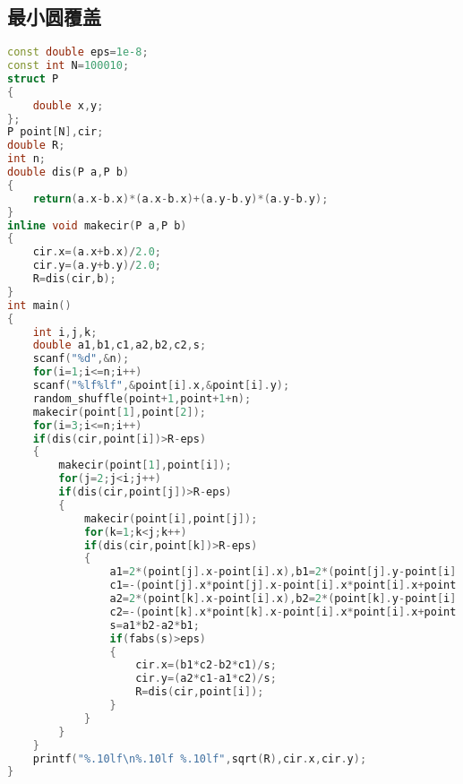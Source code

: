 \subsection{最小圆覆盖}
    \begin{lstlisting}[language=c++]
const double eps=1e-8;
const int N=100010;
struct P
{ 
    double x,y;
};
P point[N],cir;
double R;
int n;
double dis(P a,P b)
{
    return(a.x-b.x)*(a.x-b.x)+(a.y-b.y)*(a.y-b.y); 
}
inline void makecir(P a,P b)
{
    cir.x=(a.x+b.x)/2.0;
    cir.y=(a.y+b.y)/2.0;
    R=dis(cir,b);
}
int main()
{
    int i,j,k;
    double a1,b1,c1,a2,b2,c2,s;
    scanf("%d",&n);
    for(i=1;i<=n;i++)
    scanf("%lf%lf",&point[i].x,&point[i].y);
    random_shuffle(point+1,point+1+n);
    makecir(point[1],point[2]);
    for(i=3;i<=n;i++)
    if(dis(cir,point[i])>R-eps)
    {
        makecir(point[1],point[i]);
        for(j=2;j<i;j++)
        if(dis(cir,point[j])>R-eps)
        {
            makecir(point[i],point[j]);
            for(k=1;k<j;k++)
            if(dis(cir,point[k])>R-eps)
            {
                a1=2*(point[j].x-point[i].x),b1=2*(point[j].y-point[i].y),
                c1=-(point[j].x*point[j].x-point[i].x*point[i].x+point[j].y*point[j].y-point[i].y*point[i].y);
                a2=2*(point[k].x-point[i].x),b2=2*(point[k].y-point[i].y),
                c2=-(point[k].x*point[k].x-point[i].x*point[i].x+point[k].y*point[k].y-point[i].y*point[i].y);
                s=a1*b2-a2*b1;
                if(fabs(s)>eps)
                {
                    cir.x=(b1*c2-b2*c1)/s;
                    cir.y=(a2*c1-a1*c2)/s;
                    R=dis(cir,point[i]);
                }
            }
        }
    }
    printf("%.10lf\n%.10lf %.10lf",sqrt(R),cir.x,cir.y);
}
    \end{lstlisting}
